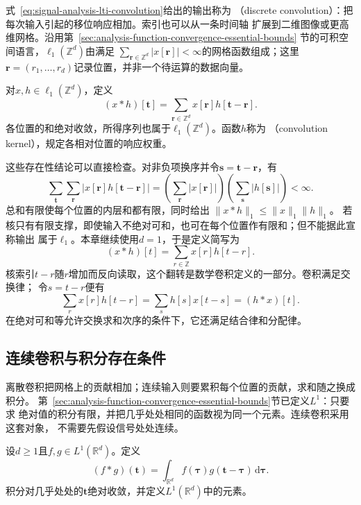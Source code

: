 式~\eqref{eq:signal-analysis-lti-convolution}给出的输出称为
（discrete convolution）：把每次输入引起的移位响应相加。索引也可以从一条时间轴
扩展到二维图像或更高维网格。沿用第~\ref{sec:analysis-function-convergence-essential-bounds}
节的可积空间语言，$\ell_1(\mathbb Z^d)$由满足
$\sum_{\bm r\in\mathbb Z^d}|x[\bm r]|<\infty$的网格函数组成；这里
$\bm r=(r_1,\ldots,r_d)$记录位置，并非一个待运算的数据向量。

\begin{definition}[网格上的离散卷积]
  \label{def:signal-analysis-discrete-convolution}
  对$x,h\in\ell_1(\mathbb Z^d)$，定义
  \begin{equation}
    (x*h)[\bm t]
    =\sum_{\bm r\in\mathbb Z^d}x[\bm r]h[\bm t-\bm r].
    \label{eq:signal-analysis-discrete-multidimensional-convolution}
  \end{equation}
  各位置的和绝对收敛，所得序列也属于$\ell_1(\mathbb Z^d)$。函数$h$称为
  （convolution kernel），规定各相对位置的响应权重。
\end{definition}

这些存在性结论可以直接检查。对非负项换序并令$\bm s=\bm t-\bm r$，有
\[
  \sum_{\bm t}\sum_{\bm r}|x[\bm r]h[\bm t-\bm r]|
  =\left(\sum_{\bm r}|x[\bm r]|\right)
   \left(\sum_{\bm s}|h[\bm s]|\right)<\infty.
\]
总和有限使每个位置的内层和都有限，同时给出
$\lVert x*h\rVert_1\leq\lVert x\rVert_1\lVert h\rVert_1$。
若核只有有限支撑，即使输入不绝对可和，也可在每个位置作有限和；但不能据此宣称输出
属于$\ell_1$。本章继续使用$d=1$，于是定义简写为
\begin{equation}
  (x*h)[t]=\sum_{r\in\mathbb{Z}}x[r]h[t-r].
  \label{eq:signal-analysis-linear-convolution}
\end{equation}
核索引$t-r$随$r$增加而反向读取，这个翻转是数学卷积定义的一部分。卷积满足交换律；
令$s=t-r$便有
\[
  \sum_r x[r]h[t-r]
  =
  \sum_s h[s]x[t-s]
  =
  (h*x)[t].
\]
在绝对可和等允许交换求和次序的条件下，它还满足结合律和分配律。

\subsection{连续卷积与积分存在条件}

离散卷积把网格上的贡献相加；连续输入则要累积每个位置的贡献，求和随之换成积分。
第~\ref{sec:analysis-function-convergence-essential-bounds}节已定义$L^1$：只要求
绝对值的积分有限，并把几乎处处相同的函数视为同一个元素。连续卷积采用这套对象，
不需要先假设信号处处连续。

\begin{definition}[连续卷积]
  \label{def:signal-analysis-continuous-convolution}
  设$d\geq1$且$f,g\in L^1(\mathbb R^d)$。定义
  \begin{equation}
    (f*g)(\bm t)
    =\int_{\mathbb R^d}f(\bm\tau)g(\bm t-\bm\tau)\,\mathrm d\bm\tau.
    \label{eq:signal-analysis-continuous-convolution}
  \end{equation}
  积分对几乎处处的$\bm t$绝对收敛，并定义$L^1(\mathbb R^d)$中的元素。
\end{definition}

